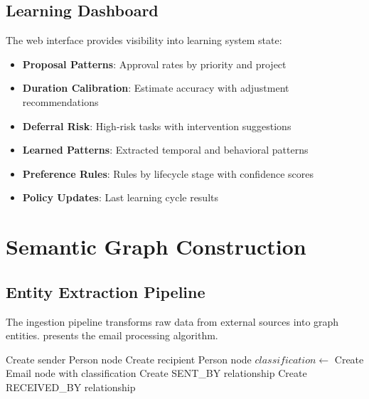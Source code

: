 \documentclass[11pt,a4paper]{article}
\begin{document}
\subsection{Learning Dashboard}

The web interface provides visibility into learning system state:

\begin{itemize}
    \item \textbf{Proposal Patterns}: Approval rates by priority and project
    \item \textbf{Duration Calibration}: Estimate accuracy with adjustment recommendations
    \item \textbf{Deferral Risk}: High-risk tasks with intervention suggestions
    \item \textbf{Learned Patterns}: Extracted temporal and behavioral patterns
    \item \textbf{Preference Rules}: Rules by lifecycle stage with confidence scores
    \item \textbf{Policy Updates}: Last learning cycle results
\end{itemize}

\section{Semantic Graph Construction}
\label{sec:graph}

\subsection{Entity Extraction Pipeline}

The ingestion pipeline transforms raw data from external sources into graph entities.  presents the email processing algorithm.

\begin{algorithm}[t]
\caption{Email Ingestion Pipeline}
\label{alg:email}
\begin{algorithmic}[1]
    \State Create sender Person node
        \State Create recipient Person node
    \EndFor
    \State $classification \gets$ 
    \State Create Email node with classification
    \State Create SENT\_BY relationship
        \State Create RECEIVED\_BY relationship
    \EndFor
    \State {}
        \State {}
    \EndIf
\EndProcedure
\end{algorithmic}
\end{algorithm}
\end{document}
